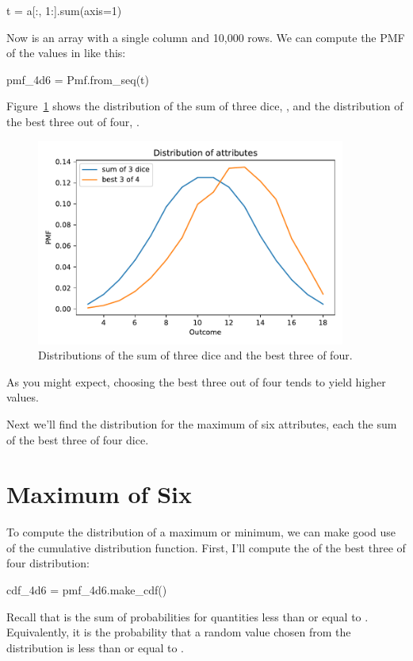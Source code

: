 \documentclass[12pt]{book}
\theoremstyle{exercise}
\begin{document}
\begin{code}
t = a[:, 1:].sum(axis=1)
\end{code}

Now  is an array with a single column and 10,000 rows.
We can compute the PMF of the values in  like this:

\begin{code}
pmf_4d6 = Pmf.from_seq(t)
\end{code}

Figure~\ref{fig06-02} shows the distribution of the sum of three dice, , and the distribution of the best three out of four, .

\begin{figure}
\centerline{\includegraphics[width=4in]{figs/fig06-02.pdf}}
\caption{Distributions of the sum of three dice and the best three of four.}
\label{fig06-02}
\end{figure}

As you might expect, choosing the best three out of four tends to yield higher values.

Next we'll find the distribution for the maximum of six attributes, each the sum of the best three of four dice.


\section{Maximum of Six}

To compute the distribution of a maximum or minimum, we can make good use of the cumulative distribution function.
First, I'll compute the  of the best three of four distribution:

\begin{code}
cdf_4d6 = pmf_4d6.make_cdf()
\end{code}

Recall that  is the sum of probabilities for quantities less than or equal to .
Equivalently, it is the probability that a random value chosen from the distribution is less than or equal to .
\end{document}
